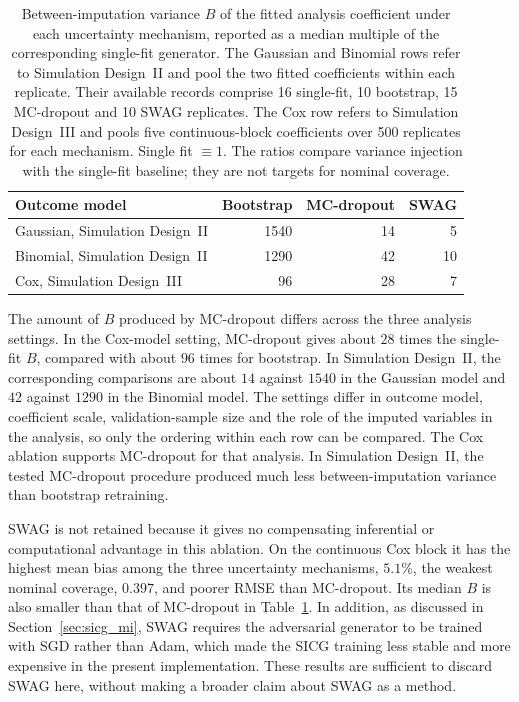 \begin{table}[!htbp]
\centering
\caption{Between-imputation variance \(B\) of the fitted analysis coefficient under each uncertainty mechanism, reported as a median multiple of the corresponding single-fit generator. The Gaussian and Binomial rows refer to Simulation Design~II and pool the two fitted coefficients within each replicate. Their available records comprise 16 single-fit, 10 bootstrap, 15 MC-dropout and 10 SWAG replicates. The Cox row refers to Simulation Design~III and pools five continuous-block coefficients over 500 replicates for each mechanism. Single fit \(\equiv 1\). The ratios compare variance injection with the single-fit baseline; they are not targets for nominal coverage.}
\label{tab:sicg_bm}
\begin{tabular}{lrrr}
\toprule
Outcome model & Bootstrap & MC-dropout & SWAG \\
\midrule
Gaussian, Simulation Design~II & 1540 & 14 & 5 \\
Binomial, Simulation Design~II & 1290 & 42 & 10 \\
Cox, Simulation Design~III & 96 & 28 & 7 \\
\bottomrule
\end{tabular}
\end{table}

The amount of \(B\) produced by MC-dropout differs across the three analysis settings. In the Cox-model setting, MC-dropout gives about \(28\) times the single-fit \(B\), compared with about \(96\) times for bootstrap. In Simulation Design~II, the corresponding comparisons are about \(14\) against \(1540\) in the Gaussian model and \(42\) against \(1290\) in the Binomial model. The settings differ in outcome model, coefficient scale, validation-sample size and the role of the imputed variables in the analysis, so only the ordering within each row can be compared. The Cox ablation supports MC-dropout for that analysis. In Simulation Design~II, the tested MC-dropout procedure produced much less between-imputation variance than bootstrap retraining.

SWAG is not retained because it gives no compensating inferential or computational advantage in this ablation. On the continuous Cox block it has the highest mean bias among the three uncertainty mechanisms, \(5.1\%\), the weakest nominal coverage, \(0.397\), and poorer RMSE than MC-dropout. Its median \(B\) is also smaller than that of MC-dropout in Table~\ref{tab:sicg_bm}. In addition, as discussed in Section~\ref{sec:sicg_mi}, SWAG requires the adversarial generator to be trained with SGD rather than Adam, which made the SICG training less stable and more expensive in the present implementation. These results are sufficient to discard SWAG here, without making a broader claim about SWAG as a method.

